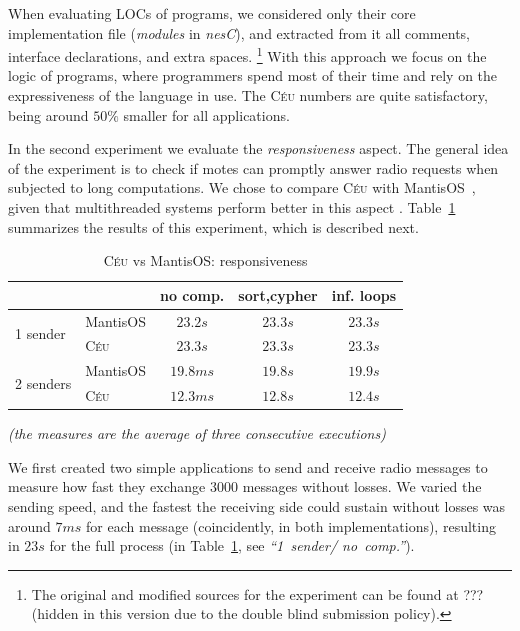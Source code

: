 \documentclass{sig-alternate-ipsn09}
\newcommand{\2}{\;\;}
\newcommand{\5}{\;\;\;\;\;}
\newcommand{\CEU}{\textsc{C\'{e}u}}
\newcommand{\nesc}{\emph{nesC}}
\begin{document}
When evaluating LOCs of programs, we considered only their core implementation
file (\emph{modules} in \nesc), and extracted from it all comments, interface 
declarations, and extra spaces.%
\footnote{
    The original and modified sources for the experiment can be found at ???  
    (hidden in this version due to the double blind submission policy).
}
With this approach we focus on the logic of programs, where programmers spend 
most of their time and rely on the expressiveness of the language in use.
The \CEU{} numbers are quite satisfactory, being around $50\%$ smaller for all 
applications.

In the second experiment we evaluate the \emph{responsiveness} aspect.
The general idea of the experiment is to check if motes can promptly answer 
radio requests when subjected to long computations.
We chose to compare \CEU{} with MantisOS~\cite{wsn.mantisos}, given that 
multithreaded systems perform better in this aspect \cite{wsn.comparison}.
Table~\ref{tab:resp} summarizes the results of this experiment, which is 
described next.

\begin{table}[h]\small
\begin{center}
\caption{\CEU{} vs MantisOS: responsiveness}
\label{tab:resp}
\begin{tabular}{ | l | l | c | c | c | }
\hline
\multicolumn{2}{|c|}{}
               & no comp. & sort,cypher & inf. loops \\
\hline\hline
\multirow{2}{*}{1 sender}
    & MantisOS &  $23.2s$ &     $23.3s$ &    $23.3s$ \\
    & \CEU     &  $23.3s$ &     $23.3s$ &    $23.3s$ \\
\hline\hline
\multirow{2}{*}{2 senders}
    & MantisOS &  $19.8ms$ &     $19.8s$ &   $19.9s$ \\
    & \CEU     &  $12.3ms$ &     $12.8s$ &   $12.4s$ \\
\hline
\end{tabular}
{\scriptsize\emph{(the measures are the average of three consecutive 
executions)}}
\end{center}
\end{table}

We first created two simple applications to send and receive radio messages to 
measure how fast they exchange $3000$ messages without losses.
We varied the sending speed, and the fastest the receiving side could sustain 
without losses was around $7ms$ for each message (coincidently, in both 
implementations), resulting in $23s$ for the full process (in 
Table~\ref{tab:resp}, see \emph{``1~sender/ no~comp.''}).
\end{document}

